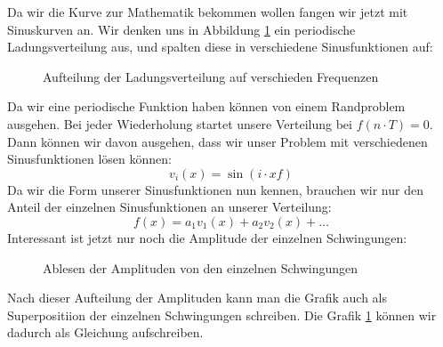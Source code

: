 Da wir die Kurve zur Mathematik bekommen wollen fangen wir jetzt mit Sinuskurven an. Wir denken uns in Abbildung \ref{fig:frequenzaufteilung} ein periodische Ladungsverteilung aus, und spalten diese in verschiedene Sinusfunktionen auf:
\begin{figure}[H]
	\caption{Aufteilung der Ladungsverteilung auf verschieden Frequenzen}\label{fig:frequenzaufteilung}
\end{figure}
Da wir eine periodische Funktion haben können von einem Randproblem ausgehen. Bei jeder Wiederholung startet unsere Verteilung bei $f(n\cdot T) = 0$. Dann können wir davon ausgehen, dass wir unser Problem mit verschiedenen Sinusfunktionen lösen können:
\begin{equation}
	v_i(x) = \sin (i\cdot x f) 
\end{equation}
Da wir die Form unserer Sinusfunktionen nun kennen, brauchen wir nur den Anteil der einzelnen Sinusfunktionen an unserer Verteilung:
\begin{equation}
	f(x) = a_1 v_1(x) + a_2 v_2(x) + \dots
\end{equation}
Interessant ist jetzt nur noch die Amplitude der einzelnen Schwingungen:
\begin{figure}[H]
	\caption{Ablesen der Amplituden von den einzelnen Schwingungen} \label{fig:schwingungsaufteilung}
\end{figure}
Nach dieser Aufteilung der Amplituden kann man die Grafik auch als Superpositiion der einzelnen Schwingungen schreiben. Die Grafik \ref{fig:frequenzaufteilung} können wir dadurch als Gleichung aufschreiben.

